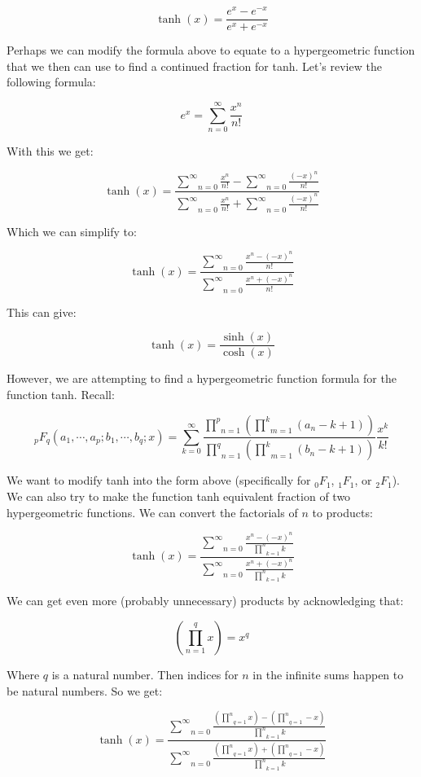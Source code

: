 \documentclass{article}
\begin{document}
$$\tanh(x)=\frac{e^x-e^{-x}}{e^x+e^{-x}}$$

Perhaps we can modify the formula above to equate to a hypergeometric function that we then can use to find a continued fraction for tanh. Let’s review the following formula:

$$e^x=\underset{n=0}{\overset{\infty}{\sum}} \frac{x^n}{n!}$$

With this we get:

$$\tanh(x)=\frac{\underset{n=0}{\overset{\infty}{\sum}} \frac{x^n}{n!} - \underset{n=0}{\overset{\infty}{\sum}} \frac{(-x)^n}{n!}}{\underset{n=0}{\overset{\infty}{\sum}} \frac{x^n}{n!} + \underset{n=0}{\overset{\infty}{\sum}} \frac{(-x)^n}{n!}}$$

Which we can simplify to:

$$\tanh(x)=\frac{\underset{n=0}{\overset{\infty}{\sum}} \frac{x^n-(-x)^{n}}{n!}}{\underset{n=0}{\overset{\infty}{\sum}} \frac{x^n+(-x)^{n}}{n!}}$$

This can give:

$$\tanh(x)=\frac{\sinh(x)}{\cosh(x)}$$

However, we are attempting to find a hypergeometric function formula for the function tanh. Recall:

$${}_p F_q (a_1,\cdots, a_p;b_1,\cdots,b_q;x) = \underset{k=0}{\overset{\infty}{\sum}} \frac{\underset{n=1}{\overset{p}{\prod}} (\underset{m=1}{\overset{k}{\prod}}(a_n-k+1))}{\underset{n=1}{\overset{q}{\prod}} (\underset{m=1}{\overset{k}{\prod}}(b_n-k+1))} \frac{x^k}{k!}$$

We want to modify tanh into the form above (specifically for $_0F_1$, $_1F_1$, or $ _2F_1$). We can also try to make the function tanh equivalent fraction of two hypergeometric functions. We can convert the factorials of $n$ to products:


$$\tanh(x)=\frac{\underset{n=0}{\overset{\infty}{\sum}} \frac{x^n-(-x)^{n}}{\underset{k=1}{\overset{n}{\prod}}k}}{\underset{n=0}{\overset{\infty}{\sum}} \frac{x^n+(-x)^{n}}{\underset{k=1}{\overset{n}{\prod}}k}}$$

We can get even more (probably unnecessary) products by acknowledging that:

$$(\underset{n=1}{\overset{q}{\prod}} x) = x^q$$

Where $q$ is a natural number. Then indices for $n$ in the infinite sums happen to be natural numbers. So we get:

$$\tanh(x)=\frac{\underset{n=0}{\overset{\infty}{\sum}} \frac{(\underset{q=1}{\overset{n}{\prod}} x)-(\underset{q=1}{\overset{n}{\prod}} -x)} {\underset{k=1}{\overset{n}{\prod}}k}}{\underset{n=0}{\overset{\infty}{\sum}} \frac{(\underset{q=1}{\overset{n}{\prod}} x)+(\underset{q=1}{\overset{n}{\prod}} -x)}{\underset{k=1}{\overset{n}{\prod}}k}}$$
\end{document}

